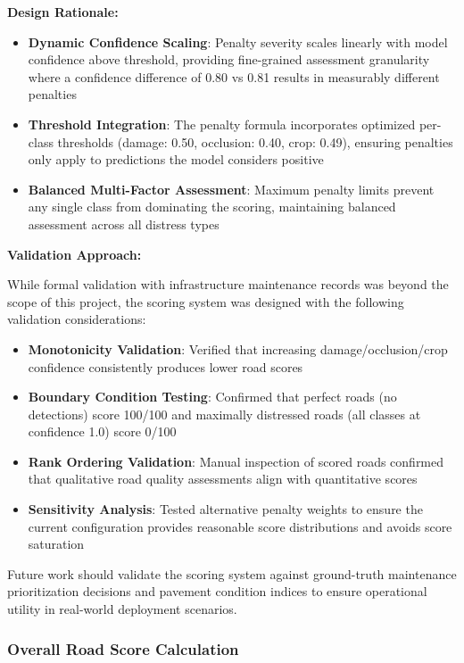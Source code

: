 \documentclass[12pt]{article}
\begin{document}
\textbf{Design Rationale:}

\begin{itemize}[itemsep=1pt,parsep=0pt,topsep=3pt]
\item \textbf{Dynamic Confidence Scaling}: Penalty severity scales linearly with model confidence above threshold, providing fine-grained assessment granularity where a confidence difference of 0.80 vs 0.81 results in measurably different penalties
\item \textbf{Threshold Integration}: The penalty formula incorporates optimized per-class thresholds (damage: 0.50, occlusion: 0.40, crop: 0.49), ensuring penalties only apply to predictions the model considers positive
\item \textbf{Balanced Multi-Factor Assessment}: Maximum penalty limits prevent any single class from dominating the scoring, maintaining balanced assessment across all distress types
\end{itemize}

\textbf{Validation Approach:}

While formal validation with infrastructure maintenance records was beyond the scope of this project, the scoring system was designed with the following validation considerations:

\begin{itemize}[itemsep=1pt,parsep=0pt,topsep=3pt]
\item \textbf{Monotonicity Validation}: Verified that increasing damage/occlusion/crop confidence consistently produces lower road scores
\item \textbf{Boundary Condition Testing}: Confirmed that perfect roads (no detections) score 100/100 and maximally distressed roads (all classes at confidence 1.0) score 0/100
\item \textbf{Rank Ordering Validation}: Manual inspection of scored roads confirmed that qualitative road quality assessments align with quantitative scores
\item \textbf{Sensitivity Analysis}: Tested alternative penalty weights to ensure the current configuration provides reasonable score distributions and avoids score saturation
\end{itemize}

Future work should validate the scoring system against ground-truth maintenance prioritization decisions and pavement condition indices to ensure operational utility in real-world deployment scenarios.

\subsubsection{Overall Road Score Calculation}
\end{document}
